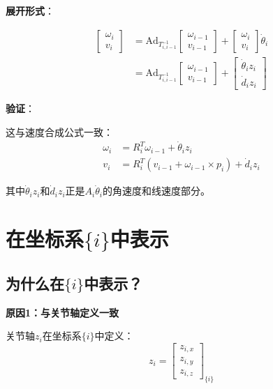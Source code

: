 \documentclass[12pt,a4paper]{article}
\begin{document}
\textbf{展开形式}：

\begin{align}
\begin{bmatrix} \omega_i \\ v_i \end{bmatrix} &= \text{Ad}_{T_{i,i-1}^{-1}} \begin{bmatrix} \omega_{i-1} \\ v_{i-1} \end{bmatrix} + \begin{bmatrix} \omega_i \\ v_i \end{bmatrix} \dot{\theta}_i \\
&= \text{Ad}_{T_{i,i-1}^{-1}} \begin{bmatrix} \omega_{i-1} \\ v_{i-1} \end{bmatrix} + \begin{bmatrix} \dot{\theta}_i z_i \\ \dot{d}_i z_i \end{bmatrix}
\end{align}

\textbf{验证}：

这与速度合成公式一致：
\begin{align}
\omega_i &= R_i^T \omega_{i-1} + \dot{\theta}_i z_i \\
v_i &= R_i^T (v_{i-1} + \omega_{i-1} \times p_i) + \dot{d}_i z_i
\end{align}

其中$\dot{\theta}_i z_i$和$\dot{d}_i z_i$正是$A_i \dot{\theta}_i$的角速度和线速度部分。

\section{在坐标系$\{i\}$中表示}

\subsection{为什么在$\{i\}$中表示？}

\textbf{原因1：与关节轴定义一致}

关节轴$z_i$在坐标系$\{i\}$中定义：
\begin{equation}
z_i = \begin{bmatrix} z_{i,x} \\ z_{i,y} \\ z_{i,z} \end{bmatrix}_{\{i\}}
\end{equation}
\end{document}
